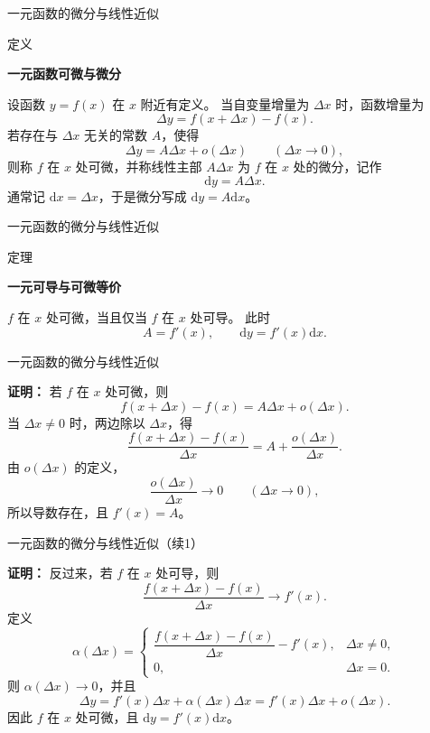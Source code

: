 \documentclass[aspectratio=169,10pt,fontset=fandol]{ctexbeamer}
\newcommand{\dd}{\mathrm{d}}
\begin{document}
\begin{frame}[t,fragile]{一元函数的微分与线性近似}
\small
\begin{block}{定义}
{\small
\textbf{一元函数可微与微分}\par

设函数 $y=f(x)$ 在 $x$ 附近有定义。 当自变量增量为 $\Delta x$ 时，函数增量为
\[
\Delta y=f(x+\Delta x)-f(x).
\]
若存在与 $\Delta x$ 无关的常数 $A$，使得
\[
\Delta y=A\Delta x+o(\Delta x)\qquad(\Delta x\to0),
\]
则称 $f$ 在 $x$ 处可微，并称线性主部 $A\Delta x$ 为 $f$ 在 $x$ 处的微分，记作
\[
\dd y=A\Delta x.
\]
通常记 $\dd x=\Delta x$，于是微分写成 $\dd y=A\dd x$。

}
\end{block}
\end{frame}
\begin{frame}[t,fragile]{一元函数的微分与线性近似}
\normalsize
\begin{block}{定理}
{\normalsize
\textbf{一元可导与可微等价}\par

$f$ 在 $x$ 处可微，当且仅当 $f$ 在 $x$ 处可导。 此时
\[
A=f'(x),\qquad \dd y=f'(x)\dd x.
\]

}
\end{block}
\end{frame}
\begin{frame}[t,fragile]{一元函数的微分与线性近似}
\normalsize
{\normalsize
\textbf{证明：}
若 $f$ 在 $x$ 处可微，则
\[
f(x+\Delta x)-f(x)=A\Delta x+o(\Delta x).
\]
当 $\Delta x\neq0$ 时，两边除以 $\Delta x$，得
\[
\frac{f(x+\Delta x)-f(x)}{\Delta x}
=A+\frac{o(\Delta x)}{\Delta x}.
\]
由 $o(\Delta x)$ 的定义，
\[
\frac{o(\Delta x)}{\Delta x}\to0\qquad(\Delta x\to0),
\]
所以导数存在，且 $f'(x)=A$。


}
\end{frame}
\begin{frame}[t,fragile]{一元函数的微分与线性近似（续1）}
\footnotesize
{\footnotesize
\textbf{证明：}
反过来，若 $f$ 在 $x$ 处可导，则
\[
\frac{f(x+\Delta x)-f(x)}{\Delta x}\to f'(x).
\]
定义
\[
\alpha(\Delta x)=
\begin{cases}
\dfrac{f(x+\Delta x)-f(x)}{\Delta x}-f'(x),&\Delta x\neq0,\\[0.8em]
0,&\Delta x=0.
\end{cases}
\]
则 $\alpha(\Delta x)\to0$，并且
\[
\Delta y=f'(x)\Delta x+\alpha(\Delta x)\Delta x
=f'(x)\Delta x+o(\Delta x).
\]
因此 $f$ 在 $x$ 处可微，且 $\dd y=f'(x)\dd x$。

}
\end{frame}
\end{document}
